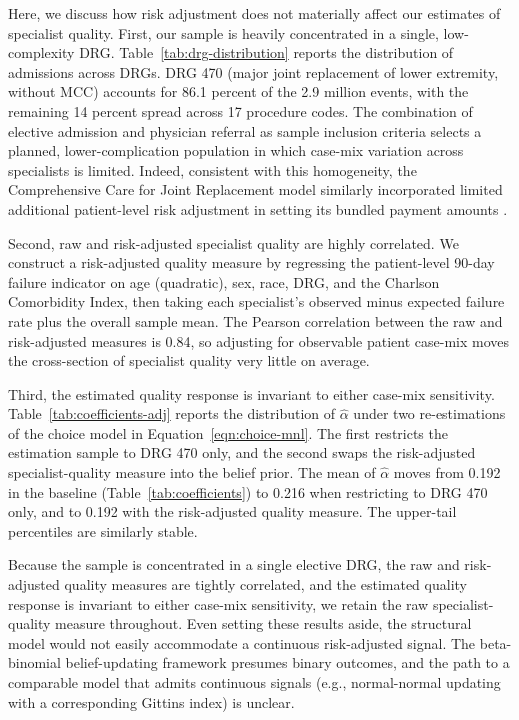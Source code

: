 \documentclass[12pt]{article}
\begin{document}
Here, we discuss how risk adjustment does not materially affect our estimates of specialist quality. First, our sample is heavily concentrated in a single, low-complexity DRG. Table~\ref{tab:drg-distribution} reports the distribution of admissions across DRGs. DRG 470 (major joint replacement of lower extremity, without MCC) accounts for 86.1 percent of the 2.9 million events, with the remaining 14 percent spread across 17 procedure codes. The combination of elective admission and physician referral as sample inclusion criteria selects a planned, lower-complication population in which case-mix variation across specialists is limited. Indeed, consistent with this homogeneity, the Comprehensive Care for Joint Replacement model similarly incorporated limited additional patient-level risk adjustment in setting its bundled payment amounts \citep{ccjr-lewin-2021}.

Second, raw and risk-adjusted specialist quality are highly correlated. We construct a risk-adjusted quality measure by regressing the patient-level 90-day failure indicator on age (quadratic), sex, race, DRG, and the Charlson Comorbidity Index, then taking each specialist's observed minus expected failure rate plus the overall sample mean. The Pearson correlation between the raw and risk-adjusted measures is 0.84, so adjusting for observable patient case-mix moves the cross-section of specialist quality very little on average.

Third, the estimated quality response is invariant to either case-mix sensitivity. Table~\ref{tab:coefficients-adj} reports the distribution of $\hat\alpha$ under two re-estimations of the choice model in Equation~\eqref{eqn:choice-mnl}. The first restricts the estimation sample to DRG 470 only, and the second swaps the risk-adjusted specialist-quality measure into the belief prior. The mean of $\hat\alpha$ moves from 0.192 in the baseline (Table~\ref{tab:coefficients}) to 0.216 when restricting to DRG 470 only, and to 0.192 with the risk-adjusted quality measure. The upper-tail percentiles are similarly stable.

Because the sample is concentrated in a single elective DRG, the raw and risk-adjusted quality measures are tightly correlated, and the estimated quality response is invariant to either case-mix sensitivity, we retain the raw specialist-quality measure throughout. Even setting these results aside, the structural model would not easily accommodate a continuous risk-adjusted signal. The beta-binomial belief-updating framework presumes binary outcomes, and the path to a comparable model that admits continuous signals (e.g., normal-normal updating with a corresponding Gittins index) is unclear.
\end{document}
